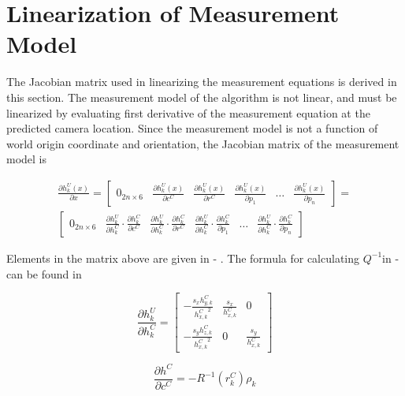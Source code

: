 \chapter{Linearization of Measurement Model}
The Jacobian matrix used in linearizing the measurement equations is
derived in this section. The measurement model of the algorithm is not
linear, and must be linearized by evaluating first derivative of the
measurement equation at the predicted camera location. Since the
measurement model is not a function of world origin coordinate and
orientation, the Jacobian matrix of the measurement model is

\begin{multline}
\frac{\partial h_{k}^{U}(x)}{\partial x}=
\begin{bmatrix}
0_{2n\times 6} & \frac{\partial h_{k}^{U}(x)}{\partial c^{C}} &
\frac{\partial h_{k}^{U}(x)}{\partial r^{C}} &
\frac{\partial h_{k}^{U}(x)}{\partial p_{1}} & 
\ldots & \frac{\partial h_{k}^{U}(x)}{\partial p_{n}}
\end{bmatrix} = \\ \begin{bmatrix}
0_{2n\times 6} & 
\frac{\partial h_{k}^{U}}{\partial h_{k}^{C}} \cdot 
\frac{\partial h_{k}^{C}}{\partial c^{C}} & 
\frac{\partial h_{k}^{U}}{\partial h_{k}^{C}} \cdot 
\frac{\partial h_{k}^{C}}{\partial r^{C}} & 
\frac{\partial h_{k}^{U}}{\partial h_{k}^{C}} \cdot 
\frac{\partial h_{k}^{C}}{\partial p_{1}} & 
\ldots & 
\frac{\partial h_{k}^{U}}{\partial h_{k}^{C}} \cdot 
\frac{\partial h_{k}^{C}}{\partial p_{n}}
\end{bmatrix}
\end{multline}


Elements in the matrix above are given in - . The formula for 
calculating $Q^{-1}$in - can be found in 

\begin{equation}
\frac{\partial h_{k}^{U}}{\partial h_{k}^{C}}= \begin{bmatrix}
-\frac{s_{x}h_{y,k}^{C}}{{h_{x,k}^{C}}^{2}} & \frac{s_{x}}{h_{x,k}^{C}} & 0 \\
-\frac{s_{y}h_{z,k}^{C}}{{h_{x,k}^{C}}^{2}} & 0 & \frac{s_{y}}{h_{x,k}^{C}}
\end{bmatrix}
\end{equation}

\begin{equation}
\frac{\partial h^{C}}{\partial c^{C}}=-R^{-1}(r_{k}^{C})\rho _{k}
\end{equation}

